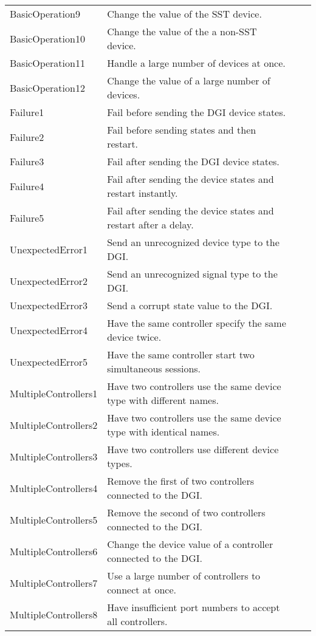 \documentclass{article}
\begin{document}
\begin{center}
\begin{footnotesize}
\begin{longtable}{|p{3cm}|p{4cm}|p{8cm}|c|}
    BasicOperation9 & Change the value of the SST device. & & \\
    BasicOperation10 & Change the value of the a non-SST device. & & \\
    BasicOperation11 & Handle a large number of devices at once. & & \\
    BasicOperation12 & Change the value of a large number of devices. & & \\
    Failure1 & Fail before sending the DGI device states. & & \\
    Failure2 & Fail before sending states and then restart. & & \\
    Failure3 & Fail after sending the DGI device states. & & \\
    Failure4 & Fail after sending the device states and restart instantly. & & \\
    Failure5 & Fail after sending the device states and restart after a delay. & & \\
    UnexpectedError1 & Send an unrecognized device type to the DGI. & & \\
    UnexpectedError2 & Send an unrecognized signal type to the DGI. & & \\
    UnexpectedError3 & Send a corrupt state value to the DGI. & & \\
    UnexpectedError4 & Have the same controller specify the same device twice. & & \\
    UnexpectedError5 & Have the same controller start two simultaneous sessions. & & \\
    MultipleControllers1 & Have two controllers use the same device type with different names. & & \\
    MultipleControllers2 & Have two controllers use the same device type with identical names. & & \\
    MultipleControllers3 & Have two controllers use different device types. & & \\
    MultipleControllers4 & Remove the first of two controllers connected to the DGI. & & \\
    MultipleControllers5 & Remove the second of two controllers connected to the DGI. & & \\
    MultipleControllers6 & Change the device value of a controller connected to the DGI. & & \\
    MultipleControllers7 & Use a large number of controllers to connect at once. & & \\
    MultipleControllers8 & Have insufficient port numbers to accept all controllers. & & \\

\end{longtable}
\end{footnotesize}
\end{center}
\end{document}
